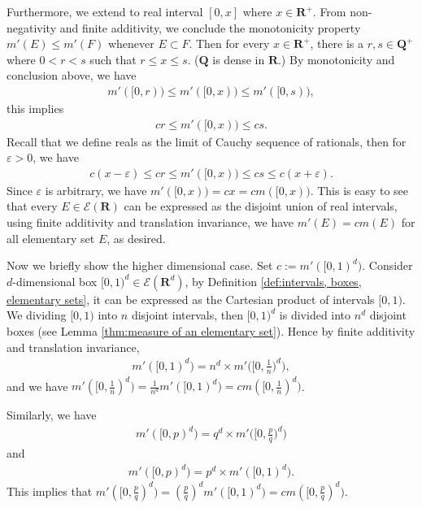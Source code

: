 \documentclass{book}
\theoremstyle{defstyle}
\theoremstyle{thmstyle}
\begin{document}
Furthermore, we extend to real interval $[0, x]$ where $x \in \mathbf{R}^+$. From non-negativity and finite additivity, we conclude the monotonicity property $m'(E) \leq m'(F)$ whenever $E \subset F$. Then for every $x \in \mathbf{R}^+$, there is a $r, s \in \mathbf{Q}^+$ where $0 < r < s$ such that $r \leq x \leq s$. ($\mathbf{Q}$ is dense in $\mathbf{R}$.) By monotonicity and conclusion above, we have
    \begin{align*}
        m'([0, r)) \leq m'([0, x)) \leq m'([0, s)),
    \end{align*}
this implies
    \begin{align*}
        cr \leq m'([0, x)) \leq cs.
    \end{align*}
Recall that we define reals as the limit of Cauchy sequence of rationals, then for $\varepsilon > 0$, we have
    \begin{align*}
        c(x - \varepsilon) \leq cr \leq m'([0, x)) \leq cs \leq c(x + \varepsilon).
    \end{align*}
Since $\varepsilon$ is arbitrary, we have $m'([0, x)) = cx = cm([0, x))$. This is easy to see that every $E \in \mathcal{E}(\mathbf{R})$ can be expressed as the disjoint union of real intervals, using finite additivity and translation invariance, we have $m'(E) = cm(E)$ for all elementary set $E$, as desired.

Now we briefly show the higher dimensional case. Set $c := m'([0, 1)^d)$. Consider $d$-dimensional box $[0, 1)^d \in \mathcal{E}(\mathbf{R}^d)$, by Definition \ref{def:intervals, boxes, elementary sets}, it can be expressed as the Cartesian product of intervals $[0, 1)$. We dividing $[0, 1)$ into $n$ disjoint intervals, then $[0, 1)^d$ is divided into $n^d$ disjoint boxes (see Lemma \ref{thm:measure of an elementary set}). Hence by finite additivity and translation invariance,
    \begin{align*}
        m'([0, 1)^d) = n^d \times m'\Big(\Big[0, \frac{1}{n}\Big)^d\Big),
    \end{align*}
and we have $m'([0, \frac{1}{n})^d) = \frac{1}{n^d}m'([0, 1)^d) = cm([0, \frac{1}{n})^d)$.

Similarly, we have
    \begin{align*}
        m'([0, p)^d) = q^d \times m'\Big(\Big[0, \frac{p}{q}\Big)^d\Big)
    \end{align*}
and
    \begin{align*}
        m'([0, p)^d) = p^d \times m'([0, 1)^d).
    \end{align*}
This implies that $m'([0, \frac{p}{q})^d) = (\frac{p}{q})^dm'([0, 1)^d) = cm([0, \frac{p}{q})^d)$.
\end{document}
